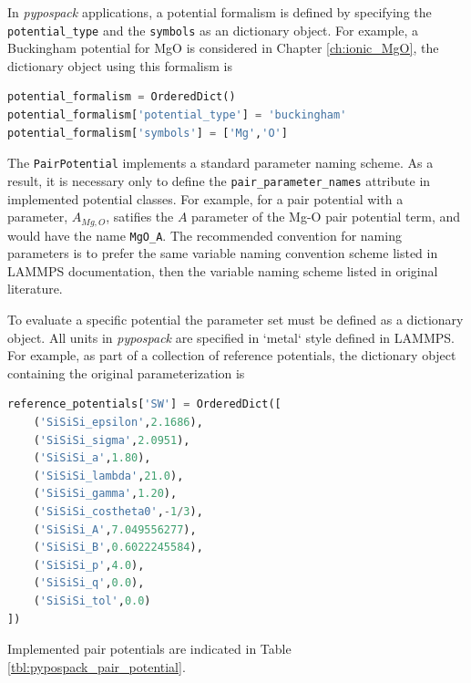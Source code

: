 In \emph{pypospack} applications, a potential formalism is defined by specifying the \verb|potential_type| and the \verb|symbols| as an dictionary object.  For example, a Buckingham potential for MgO is considered in Chapter \ref{ch:ionic_MgO}, the dictionary object using this formalism is

\begin{lstlisting}[language=Python]
potential_formalism = OrderedDict()
potential_formalism['potential_type'] = 'buckingham'
potential_formalism['symbols'] = ['Mg','O']
\end{lstlisting}

The \verb|PairPotential| implements a standard parameter naming scheme.  As a result, it is necessary only to define the \verb|pair_parameter_names| attribute in implemented potential classes.  For example, for a pair potential with a parameter, $A_{Mg,O}$, satifies the $A$ parameter of the Mg-O pair potential term, and would have the name \verb|MgO_A|.  The recommended convention for naming parameters is to prefer the same variable naming convention scheme listed in LAMMPS documentation, then the variable naming scheme listed in original literature.

To evaluate a specific potential the parameter set must be defined as a dictionary object.  All units in \emph{pypospack} are specified in `metal` style defined in LAMMPS\cite{lammps_units}.  For example, as part of a collection of reference potentials, the dictionary object containing the original parameterization is

\begin{lstlisting}[language=Python]
reference_potentials['SW'] = OrderedDict([
    ('SiSiSi_epsilon',2.1686),
    ('SiSiSi_sigma',2.0951),
    ('SiSiSi_a',1.80),
    ('SiSiSi_lambda',21.0),
    ('SiSiSi_gamma',1.20),
    ('SiSiSi_costheta0',-1/3),
    ('SiSiSi_A',7.049556277),
    ('SiSiSi_B',0.6022245584),
    ('SiSiSi_p',4.0),
    ('SiSiSi_q',0.0),
    ('SiSiSi_tol',0.0)
])
\end{lstlisting}

Implemented pair potentials are indicated in Table \ref{tbl:pypospack_pair_potential}.

